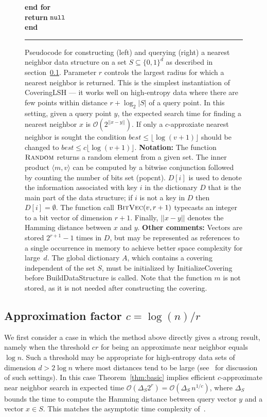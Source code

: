 \documentclass[prodmode,acmtalg]{acmsmall}
\newcommand{\Osymbol}{{\mathcal O}}
\newcommand{\BO}[1]{\Osymbol\left(#1\right)}
\begin{document}
\begin{figure}[t]
\begin{minipage}{.5\linewidth}
\begin{tabbing}
		{\bf end for}\\
		{\bf return} ${\tt null}$\-\\
	  {\bf end}
	\end{tabbing}
	\vspace{2.5mm}
	\end{minipage}
	\hrule
\caption{Pseudocode for constructing (left) and querying (right) a nearest neighbor data structure on a set $S\subseteq \{0,1\}^d$ as described in section~\ref{sec:randomdata}.
Parameter $r$ controls the largest radius for which a nearest neighbor is returned.
This is the simplest instantiation of CoveringLSH --- it works well on high-entropy data where there are few points within distance $r + \log_2 |S|$ of a query point.
In this setting, given a query point $y$, the expected search time for finding a nearest neighbor $x$ is $\BO{2^{||x-y||}}$. If only a $c$-approxiate nearest neighbor is sought the condition $best \leq \lfloor \log(v+1)\rfloor$ should be changed to $best \leq c \lfloor \log(v+1)\rfloor$. \smallskip\newline
{\bf Notation:} The function $\text{\sc Random}$ returns a random element from a given set.
The inner product $\langle m, v\rangle$ can be computed by a bitwise conjunction followed by counting the number of bits set ({\sc popcnt}).
$D[i]$ is used to denote the information associated with key $i$ in the dictionary $D$ that is the main part of the data structure; if $i$ is not a key in $D$ then $D[i]=\emptyset$. 
The function call $\text{\sc BitVec}(v,r+1)$ typecasts an integer to a bit vector of dimension $r+1$.
Finally, $||x-y||$ denotes the Hamming distance between $x$ and $y$. 
\smallskip\newline
{\bf Other comments:} 
Vectors are stored $2^{r+1}-1$ times in $D$, but may be represented as references to a single occurrence in memory to achieve better space complexity for large~$d$.
The global dictionary $A$, which contains a covering independent of the set $S$, must be initialized by {\sc InitializeCovering} before {\sc BuildDataStructure} is called.
Note that the function $m$ is not stored, as it is not needed after constructing the covering.}
\label{fig:code}
\end{figure}


\subsection{Approximation factor $c=\log(n)/r$}\label{sec:randomdata}

We first consider a case in which the method above directly gives a strong result, namely when the threshold $cr$ for being an approximate near neighbor equals $\log n$.
Such a threshold may be appropriate for high-entropy data sets of dimension $d>2\log n$ where most distances tend to be large (see~\cite{kucherov2005multiseed,norouzi2012fast} for discussion of such settings).
In this case Theorem~\ref{thm:basic} implies efficient $c$-approximate near neighbor search in expected time $\BO{\Delta_S 2^r} = \BO{\Delta_S\, n^{1/c}}$, where $\Delta_S$ bounds the time to compute the Hamming distance between query vector $y$ and a vector $x\in S$. This matches the asymptotic time complexity of~\cite{Indyk1998}.
\end{document}
